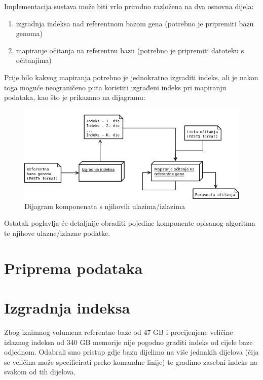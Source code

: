 \documentclass[times, utf8, diplomski]{fer}
\begin{document}
Implementacija sustava može biti vrlo prirodno razložena na dva osnovna dijela:

\begin{enumerate}
\item izgradnja indeksa nad referentnom bazom gena (potrebno je pripremiti bazu genoma)
\item mapiranje očitanja na referentnu bazu (potrebno je pripremiti datoteku s očitanjima)
\end{enumerate}

Prije bilo kakvog mapiranja potrebno je jednokratno izgraditi indeks, ali je nakon toga moguće neograničeno puta koristiti izgrađeni indeks pri mapiranju podataka, kao što je prikazano na dijagramu:

\begin{figure}[!ht]
\begin{center}
	\includegraphics[width=1\textwidth]{../img/Komponente.png}
	\caption{Dijagram komponenata s njihovih ulazima/izlazima}
\end{center}
\end{figure}


Ostatak poglavlja će detaljnije obraditi pojedine komponente opisanog algoritma te njihove ulazne/izlazne podatke.

\section{Priprema podataka}

\section{Izgradnja indeksa}
Zbog iznimnog volumena referentne baze od 47 GB i procijenjene veličine izlaznog indeksa od 340 GB memorije nije
pogodno graditi indeks od cijele baze odjednom. Odabrali smo pristup gdje bazu dijelimo na više jednakih dijelova
(čija se veličina može specificirati preko komandne linije) te gradimo zasebni indeks na svakom od tih dijelova.
\end{document}
